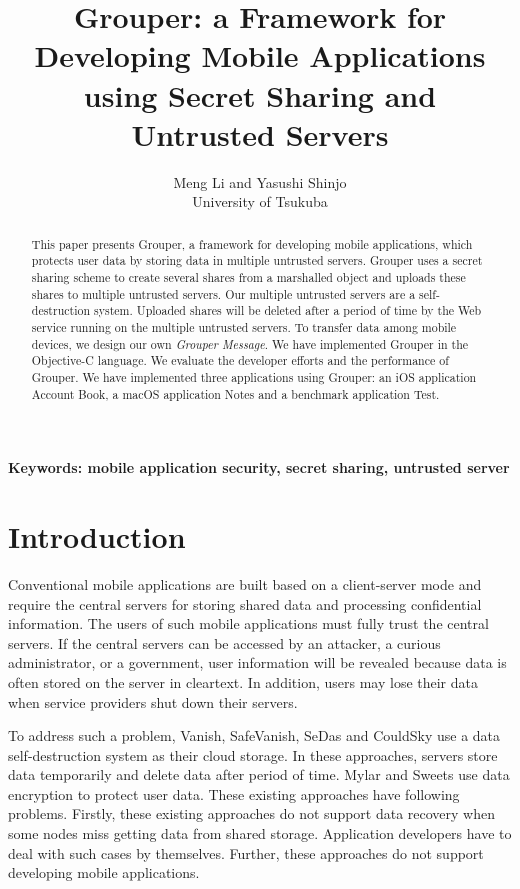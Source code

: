 \documentclass[twocolumn,10pt]{article}
\begin{document}
\title{\bf Grouper: a Framework for Developing Mobile Applications using Secret Sharing and Untrusted Servers}

\author{
	Meng Li and Yasushi Shinjo \\
	University of Tsukuba
}

\maketitle

\begin{abstract}

This paper presents Grouper, a framework for developing mobile applications, which protects user data by storing data in multiple untrusted servers.
Grouper uses a secret sharing scheme to create several shares from a marshalled object and uploads these shares to multiple untrusted servers. 
Our multiple untrusted servers are a self-destruction system.
Uploaded shares will be deleted after a period of time by the Web service running on the multiple untrusted servers.
To transfer data among mobile devices, we design our own \emph{Grouper Message}. 
We have implemented Grouper in the Objective-C language.
We evaluate the developer efforts and the performance of Grouper. 
We have implemented three applications using Grouper: an iOS application Account Book, a macOS application Notes and a benchmark application Test.

\end{abstract}

\textbf{Keywords: mobile application security, secret sharing, untrusted server}

\section{Introduction}

Conventional mobile applications are built based on a client-server mode and require the central servers for storing shared data and processing confidential information.
The users of such mobile applications must fully trust the central servers. 
If the central servers can be accessed by an attacker, a curious administrator, or a government, user information will be revealed because data is often stored on the server in cleartext. 
In addition, users may lose their data when service providers shut down their servers.

To address such a problem, Vanish\cite{geambasu2009vanish}, SafeVanish\cite{zeng2010safevanish}, SeDas\cite{zeng2012sedas} and CouldSky\cite{zeng2015cloudsky} use a data self-destruction system as their cloud storage.
In these approaches, servers store data temporarily and delete data after period of time.
Mylar\cite{popa2014building} and Sweets\cite{sweets} use data encryption to protect user data.
These existing approaches have following problems.
Firstly, these existing approaches do not support data recovery when some nodes miss getting data from shared storage.
Application developers have to deal with such cases by themselves.
Further, these approaches do not support developing mobile applications.
\end{document}
